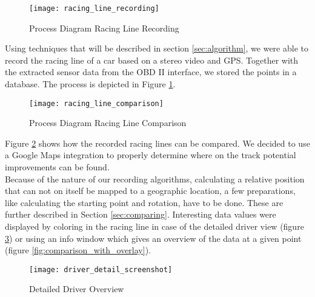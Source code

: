 \begin{figure}[!ht]
		\centering
		\texttt{[image: racing\_line\_recording]}
		\caption{Process Diagram Racing Line Recording}
		\label{fig:racing_line_recording}
\end{figure}
\clearpage
Using techniques that will be described in section \ref{sec:algorithm}, we were able to record the racing line of a car based on a stereo video and GPS. Together with the extracted sensor data from the OBD II interface, we stored the points in a database. The process is depicted in Figure \ref{fig:racing_line_recording}.

\begin{figure}[!ht]
	\centering
	\texttt{[image: racing\_line\_comparison]}
	\caption{Process Diagram Racing Line Comparison}
	\label{fig:racing_line_comparison}
\end{figure}

Figure \ref{fig:racing_line_comparison} shows how the recorded racing lines can be compared. We decided to use a Google Maps integration to properly determine where on the track potential improvements can be found.\\
Because of the nature of our recording algorithms, calculating a relative position that can not on itself be mapped to a geographic location, a few preparations, like calculating the starting point and rotation, have to be done. These are further described in Section \ref{sec:comparing}. Interesting data values were displayed by coloring in the racing line in case of the detailed driver view (figure \ref{fig:driver_detail}) or using an info window which gives an overview of the data at a given point (figure \ref{fig:comparison_with_overlay}).

\begin{figure}[!ht]
	\texttt{[image: driver\_detail\_screenshot]}
	\caption{Detailed Driver Overview}
	\label{fig:driver_detail}
\end{figure}

\clearpage